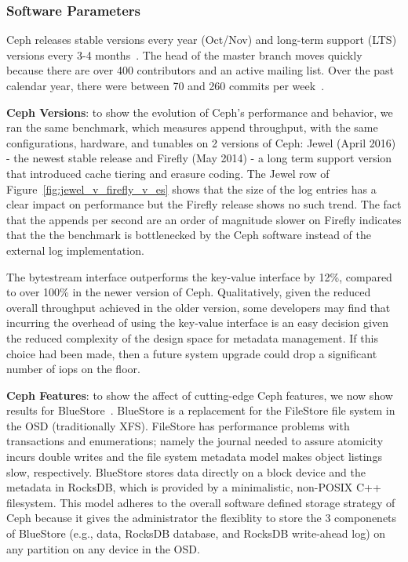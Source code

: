 \documentclass[10pt,twocolumn]{article}
\begin{document}
\subsubsection{Software Parameters}

Ceph releases stable versions every year (Oct/Nov) and long-term support (LTS)
versions every 3-4 months~\cite{website:ceph-releases}. The head of the master
branch moves quickly because there are over 400 contributors and an active
mailing list.  Over the past calendar year, there were between 70 and 260
commits per week~\cite{website:ceph-github}. 

\textbf{Ceph Versions}: to show the evolution of Ceph's performance and
behavior, we ran the same benchmark, which measures append throughput, with the
same configurations, hardware, and tunables on 2 versions of Ceph: Jewel (April
2016) - the newest stable release and Firefly (May 2014) - a long term support
version that introduced cache tiering and erasure coding. The Jewel row of 
Figure~\ref{fig:jewel_v_firefly_v_es} shows that the size of the log entries
has a clear impact on performance but the Firefly release shows no such trend.
The fact that the appends per second are an order of magnitude slower on
Firefly indicates that the the benchmark is bottlenecked by the Ceph software
instead of the external log implementation. 

The bytestream interface outperforms the key-value interface by 12\%, compared
to over 100\% in the newer version of Ceph. Qualitatively, given the reduced
overall throughput achieved in the older version, some developers may find that
incurring the overhead of using the key-value interface is an easy decision
given the reduced complexity of the design space for metadata management. If
this choice had been made, then a future system upgrade could drop a
significant number of iops on the floor.

\textbf{Ceph Features}: to show the affect of cutting-edge Ceph features, we
now show results for BlueStore~\cite{weil:vault2016-bluestore}. BlueStore is a
replacement for the FileStore file system in the OSD (traditionally XFS).
FileStore has performance problems with transactions and enumerations; namely
the journal needed to assure atomicity incurs double writes and the file system
metadata model makes object listings slow, respectively. BlueStore stores data
directly on a block device and the metadata in RocksDB, which is provided by a
minimalistic, non-POSIX C++ filesystem. This model adheres to the overall
software defined storage strategy of Ceph because it gives the administrator
the flexiblity to store the 3 componenets of BlueStore (e.g., data, RocksDB
database, and RocksDB write-ahead log) on any partition on any device in the
OSD. 
\end{document}
